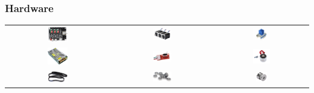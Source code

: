 \documentclass{beamer}
\begin{document}
\begin{frame}
\frametitle{Hardware}
\begin{table}[htbp]
  \centering
  \begin{tabular}{ccc}
      \includegraphics[width=0.2\textwidth, valign=m]{figs/mksdlc32.jpg} & \includegraphics[width=0.2\textwidth, valign=m]{figs/nema17.jpg} &
      \includegraphics[width=0.2\textwidth, valign=m]{figs/TMC2209.jpg} \\
      \includegraphics[width=0.2\textwidth, valign=m]{figs/pw24v.jpg} & \includegraphics[width=0.2\textwidth, valign=m]{figs/finaldecarrera.jpg} & 
      \includegraphics[width=0.2\textwidth, valign=m]{figs/d20h15.jpg} \\ 
      \includegraphics[width=0.2\textwidth, valign=m]{figs/correa.png} & \includegraphics[width=0.2\textwidth, valign=m]{figs/F695-2RS.jpeg} & 
      \includegraphics[width=0.12\textwidth, valign=m]{figs/20t.jpg}
  \end{tabular}
\end{table}
\end{frame}
\end{document}
